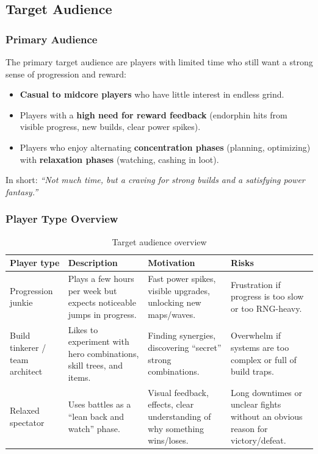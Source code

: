 \subsection{Target Audience}

\subsubsection*{Primary Audience}

The primary target audience are players with limited time who still want a strong sense of progression and reward:

\begin{itemize}
	\item \textbf{Casual to midcore players} who have little interest in endless grind.
	\item Players with a \textbf{high need for reward feedback} (endorphin hits from visible progress, new builds, clear power spikes).
	\item Players who enjoy alternating \textbf{concentration phases} (planning, optimizing) with \textbf{relaxation phases} (watching, cashing in loot).
\end{itemize}

In short: \emph{“Not much time, but a craving for strong builds and a satisfying power fantasy.”}

\subsubsection*{Player Type Overview}

\begin{table}[h]
	\centering
	\begin{tabular}{p{3cm}p{4.5cm}p{4cm}p{3.5cm}}
		\textbf{Player type} & \textbf{Description} & \textbf{Motivation} & \textbf{Risks} \\
		\hline
		Progression junkie &
		Plays a few hours per week but expects noticeable jumps in progress. &
		Fast power spikes, visible upgrades, unlocking new maps/waves. &
		Frustration if progress is too slow or too RNG-heavy. \\
		\hline
		Build tinkerer / team architect &
		Likes to experiment with hero combinations, skill trees, and items. &
		Finding synergies, discovering “secret” strong combinations. &
		Overwhelm if systems are too complex or full of build traps. \\
		\hline
		Relaxed spectator &
		Uses battles as a “lean back and watch” phase. &
		Visual feedback, effects, clear understanding of why something wins/loses. &
		Long downtimes or unclear fights without an obvious reason for victory/defeat. \\
	\end{tabular}
	\caption{Target audience overview}
	\label{tab:target-audience}
\end{table}

